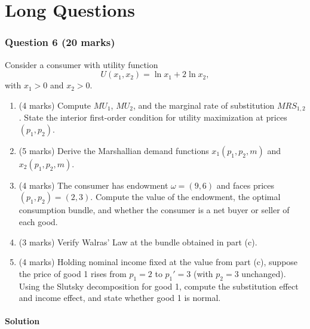 \documentclass[12pt]{article}
\begin{document}
\newpage
\part{Long Questions}

\section*{Question 6 (20 marks)}

Consider a consumer with utility function
\[
U(x_1,x_2)=\ln x_1+2\ln x_2,
\]
with $x_1>0$ and $x_2>0$.

\begin{enumerate}[label=(\alph*)]
\item (4 marks) Compute $MU_1$, $MU_2$, and the marginal rate of substitution $MRS_{1,2}$. State the interior first-order condition for utility maximization at prices $(p_1,p_2)$.
\item (5 marks) Derive the Marshallian demand functions $x_1(p_1,p_2,m)$ and $x_2(p_1,p_2,m)$.
\item (4 marks) The consumer has endowment $\omega=(9,6)$ and faces prices $(p_1,p_2)=(2,3)$. Compute the value of the endowment, the optimal consumption bundle, and whether the consumer is a net buyer or seller of each good.
\item (3 marks) Verify Walras' Law at the bundle obtained in part (c).
\item (4 marks) Holding nominal income fixed at the value from part (c), suppose the price of good 1 rises from $p_1=2$ to $p_1'=3$ (with $p_2=3$ unchanged). Using the Slutsky decomposition for good 1, compute the substitution effect and income effect, and state whether good 1 is normal.
\end{enumerate}

\subsection*{Solution}
\end{document}
